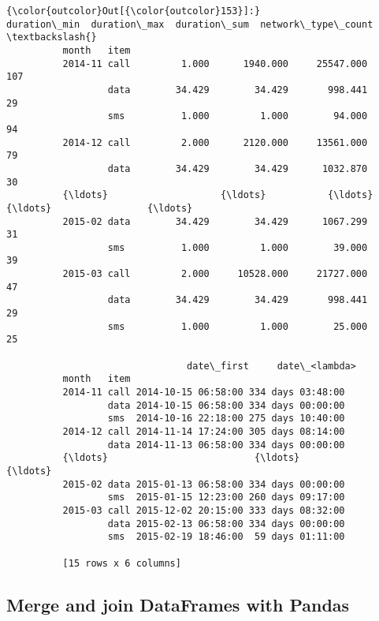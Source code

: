 \documentclass[11pt]{article}
\begin{document}
\begin{Verbatim}[commandchars=\\\{\}]
{\color{outcolor}Out[{\color{outcolor}153}]:}               duration\_min  duration\_max  duration\_sum  network\_type\_count  \textbackslash{}
          month   item                                                                 
          2014-11 call         1.000      1940.000     25547.000                 107   
                  data        34.429        34.429       998.441                  29   
                  sms          1.000         1.000        94.000                  94   
          2014-12 call         2.000      2120.000     13561.000                  79   
                  data        34.429        34.429      1032.870                  30   
          {\ldots}                    {\ldots}           {\ldots}           {\ldots}                 {\ldots}   
          2015-02 data        34.429        34.429      1067.299                  31   
                  sms          1.000         1.000        39.000                  39   
          2015-03 call         2.000     10528.000     21727.000                  47   
                  data        34.429        34.429       998.441                  29   
                  sms          1.000         1.000        25.000                  25   
          
                                date\_first     date\_<lambda>  
          month   item                                        
          2014-11 call 2014-10-15 06:58:00 334 days 03:48:00  
                  data 2014-10-15 06:58:00 334 days 00:00:00  
                  sms  2014-10-16 22:18:00 275 days 10:40:00  
          2014-12 call 2014-11-14 17:24:00 305 days 08:14:00  
                  data 2014-11-13 06:58:00 334 days 00:00:00  
          {\ldots}                          {\ldots}               {\ldots}  
          2015-02 data 2015-01-13 06:58:00 334 days 00:00:00  
                  sms  2015-01-15 12:23:00 260 days 09:17:00  
          2015-03 call 2015-12-02 20:15:00 333 days 08:32:00  
                  data 2015-02-13 06:58:00 334 days 00:00:00  
                  sms  2015-02-19 18:46:00  59 days 01:11:00  
          
          [15 rows x 6 columns]
\end{Verbatim}
            
    \subsection{Merge and join DataFrames with
Pandas}\label{merge-and-join-dataframes-with-pandas}
\end{document}
